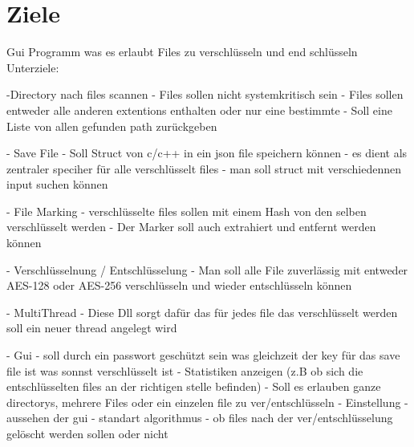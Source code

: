 \chapter{Ziele}
\hypertarget{md__ziele}{}\label{md__ziele}
Gui Programm was es erlaubt Files zu verschlüsseln und end schlüsseln Unterziele\+: \begin{DoxyVerb}-Directory nach files scannen
    - Files sollen nicht systemkritisch sein
    - Files sollen entweder alle anderen extentions enthalten oder nur eine bestimmte
    - Soll eine Liste von allen gefunden path zurückgeben

- Save File
    - Soll Struct von c/c++ in ein json file speichern können
    - es dient als zentraler speciher für alle verschlüsselt files
    - man soll struct mit verschiedennen input suchen können

- File Marking
    - verschlüsselte files sollen mit einem Hash von den selben verschlüsselt werden
    - Der Marker soll auch extrahiert und entfernt werden können

- Verschlüsselnung / Entschlüsselung
    - Man soll alle File zuverlässig mit entweder AES-128 oder AES-256 verschlüsseln und wieder entschlüsseln können

- MultiThread
    - Diese Dll sorgt dafür das für jedes file das verschlüsselt werden soll ein neuer thread angelegt wird

- Gui
    - soll durch ein passwort geschützt sein was gleichzeit der key für das save file ist was sonnst verschlüsselt ist
    - Statistiken anzeigen (z.B ob sich die entschlüsselten files an der richtigen stelle befinden)
    - Soll es erlauben ganze directorys, mehrere Files oder ein einzelen file zu ver/entschlüsseln
    - Einstellung
        - aussehen der gui
        - standart algorithmus
        - ob files nach der ver/entschlüsselung gelöscht werden sollen oder nicht
\end{DoxyVerb}
 